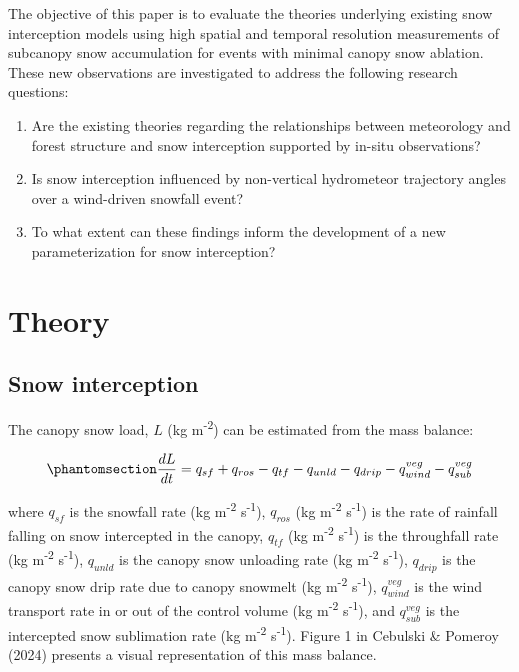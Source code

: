 \documentclass[
  letterpaper,
  DIV=11,
  numbers=noendperiod]{scrartcl}
\begin{document}
The objective of this paper is to evaluate the theories underlying
existing snow interception models using high spatial and temporal
resolution measurements of subcanopy snow accumulation for events with
minimal canopy snow ablation. These new observations are investigated to
address the following research questions:

\begin{enumerate}
\def\labelenumi{\arabic{enumi}.}
\item
  Are the existing theories regarding the relationships between
  meteorology and forest structure and snow interception supported by
  in-situ observations?
\item
  Is snow interception influenced by non-vertical hydrometeor trajectory
  angles over a wind-driven snowfall event?
\item
  To what extent can these findings inform the development of a new
  parameterization for snow interception?
\end{enumerate}

\section{Theory}\label{theory}

\subsection{Snow interception}\label{snow-interception}

The canopy snow load, \(L\) (kg m\textsuperscript{-2}) can be estimated
from the mass balance:

\begin{equation}\phantomsection\label{eq-canopy-mass-bal}{
\frac{dL}{dt} = 
q_{sf} + q_{ros} - q_{tf} - q_{unld} - q_{drip} - q_{wind}^{veg} - q_{sub}^{veg}
}\end{equation}

where \(q_{sf}\) is the snowfall rate (kg m\textsuperscript{-2}
s\textsuperscript{-1}), \(q_{ros}\) (kg m\textsuperscript{-2}
s\textsuperscript{-1}) is the rate of rainfall falling on snow
intercepted in the canopy, \(q_{tf}\) (kg m\textsuperscript{-2}
s\textsuperscript{-1}) is the throughfall rate (kg m\textsuperscript{-2}
s\textsuperscript{-1}), \(q_{unld}\) is the canopy snow unloading rate
(kg m\textsuperscript{-2} s\textsuperscript{-1}), \(q_{drip}\) is the
canopy snow drip rate due to canopy snowmelt (kg m\textsuperscript{-2}
s\textsuperscript{-1}), \(q_{wind}^{veg}\) is the wind transport rate in
or out of the control volume (kg m\textsuperscript{-2}
s\textsuperscript{-1}), and \(q_{sub}^{veg}\) is the intercepted snow
sublimation rate (kg m\textsuperscript{-2} s\textsuperscript{-1}).
Figure 1 in Cebulski \& Pomeroy (2024) presents a visual representation
of this mass balance.
\end{document}
